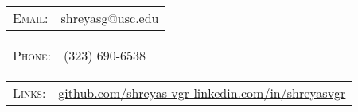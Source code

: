 \begin{tabular}{rl}
\textsc{Email:} & shreyasg@usc.edu\\
\end{tabular}
\hfill
\begin{tabular}{rl}
\textsc{\hspace{2.0cm}Phone:} & (323) 690-6538\\
\end{tabular}
%
\begin{tabular}{rl}
\textsc{Links:} & \href{http://github.com/shreyas-vgr}{github.com/shreyas-vgr}\hspace{8.1cm}\href{ http://www.linkedin.com/in/shreyasvgr}{ linkedin.com/in/shreyasvgr}
\end{tabular}
\vspace{5pt}
